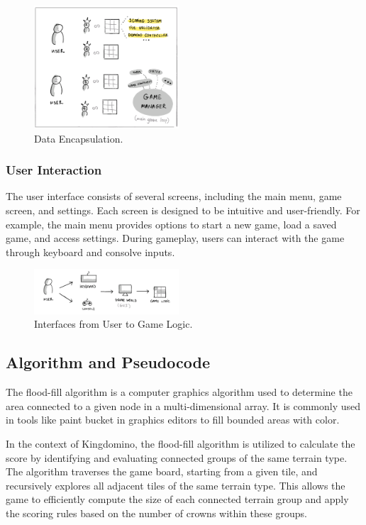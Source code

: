 \documentclass[conference]{IEEEtran}
\begin{document}
\begin{figure}[htbp]
    \centerline{\includegraphics[width=0.48\textwidth]{assets/GameManager.png}}
    \caption{Data Encapsulation.}\label{fig:gamemanager}
\end{figure}

\subsubsection{User Interaction}
The user interface consists of several screens, including the main menu, game
screen, and settings. Each screen is designed to be intuitive and
user-friendly. For example, the main menu provides options to start a new game,
load a saved game, and access settings. During gameplay, users can interact
with the game through keyboard and consolve inputs.

\begin{figure}[htbp]
    \centerline{\includegraphics[width=0.48\textwidth]{assets/interaction.png}}
    \caption{Interfaces from User to Game Logic.}\label{fig:interaction}
\end{figure}

\subsection{Algorithm and Pseudocode}

The flood-fill algorithm is a computer graphics algorithm used to determine the
area connected to a given node in a multi-dimensional array. It is commonly
used in tools like paint bucket in graphics editors to fill bounded areas with
color.

In the context of Kingdomino, the flood-fill algorithm is utilized to calculate
the score by identifying and evaluating connected groups of the same terrain
type. The algorithm traverses the game board, starting from a given tile, and
recursively explores all adjacent tiles of the same terrain type. This allows
the game to efficiently compute the size of each connected terrain group and
apply the scoring rules based on the number of crowns within these groups.
\end{document}
